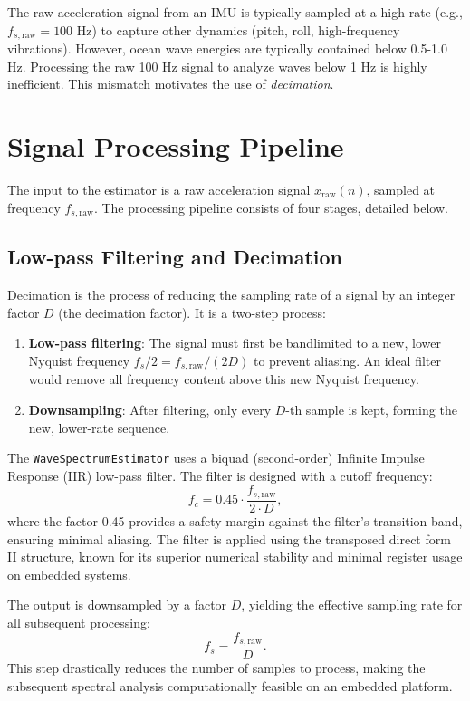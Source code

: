 \documentclass[11pt,letterpaper]{article}
\begin{document}
The raw acceleration signal from an IMU is typically sampled at a high rate (e.g., $f_{s,\text{raw}} = 100$ Hz) to capture other dynamics (pitch, roll, high-frequency vibrations). However, ocean wave energies are typically contained below 0.5-1.0 Hz. Processing the raw 100 Hz signal to analyze waves below 1 Hz is highly inefficient. This mismatch motivates the use of \textit{decimation}.

\section{Signal Processing Pipeline}
\label{sec:pipeline}
The input to the estimator is a raw acceleration signal $x_{\text{raw}}(n)$, sampled at frequency $f_{s,\text{raw}}$. The processing pipeline consists of four stages, detailed below.

\subsection{Low-pass Filtering and Decimation}
\label{subsec:decimation}
Decimation is the process of reducing the sampling rate of a signal by an integer factor $D$ (the decimation factor). It is a two-step process:
\begin{enumerate}
    \item \textbf{Low-pass filtering}: The signal must first be bandlimited to a new, lower Nyquist frequency $f_s/2 = f_{s,\text{raw}}/(2D)$ to prevent aliasing. An ideal filter would remove all frequency content above this new Nyquist frequency.
    \item \textbf{Downsampling}: After filtering, only every $D$-th sample is kept, forming the new, lower-rate sequence.
\end{enumerate}

The \texttt{WaveSpectrumEstimator} uses a biquad (second-order) Infinite Impulse Response (IIR) low-pass filter. The filter is designed with a cutoff frequency:
\begin{equation}
f_c = 0.45 \cdot \frac{f_{s,\text{raw}}}{2 \cdot D},
\end{equation}
where the factor 0.45 provides a safety margin against the filter's transition band, ensuring minimal aliasing. The filter is applied using the transposed direct form II structure, known for its superior numerical stability and minimal register usage on embedded systems.

The output is downsampled by a factor $D$, yielding the effective sampling rate for all subsequent processing:
\begin{equation}
f_s = \frac{f_{s,\text{raw}}}{D}.
\end{equation}
This step drastically reduces the number of samples to process, making the subsequent spectral analysis computationally feasible on an embedded platform.
\end{document}
